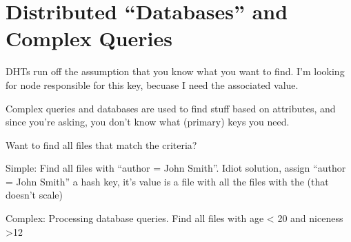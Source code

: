 \documentclass[10pt,letterpaper,twoside]{report}
\begin{document}






\section{Distributed ``Databases'' and Complex Queries}


DHTs run off the assumption that you know what you want to find.
I'm looking for node responsible for this key, becuase I need the associated value.

Complex queries and databases are used to find stuff based on attributes, and since you're asking, you don't know what (primary) keys you need.


Want to find all files that match the criteria?





Simple: Find all files with ``author = John Smith''.  Idiot solution, assign ``author = John Smith'' a hash key,  it's value is a file with all the files with the (that doesn't scale) 


Complex: Processing database queries.   Find all files with age < 20 and niceness >12
\end{document}
